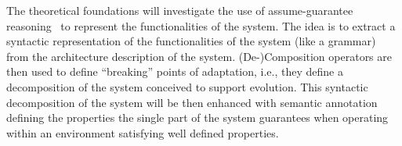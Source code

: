 \documentclass[12pt]{article}
\begin{document}
The theoretical foundations will investigate %
the use of assume-guarantee reasoning~\cite{Pnueli1989} to represent the functionalities of the system. %
The idea is to extract a syntactic representation of the functionalities of the system (like a grammar) from the architecture description of the system. %
(De-)Composition operators are then used to define ``breaking'' points of adaptation, i.e., they define a decomposition of the system conceived to support evolution. This syntactic decomposition of the system will be then enhanced with semantic annotation defining the properties the single part of the system guarantees when operating within an environment satisfying well defined properties.

%
%
\end{document}
